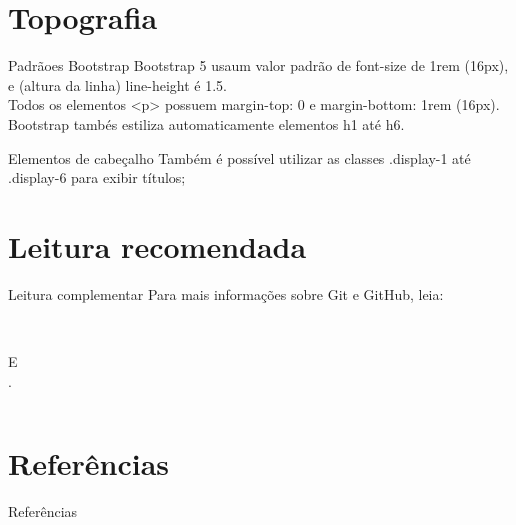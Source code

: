 \documentclass{beamer}
\begin{document}
\section{Topografia}
\begin{frame}{Padrãoes Bootstrap}
Bootstrap 5 usaum valor padrão de font-size de 1rem (16px), e (altura da linha) line-height é 1.5.\\
\vspace{0.5cm}
Todos os elementos <p> possuem margin-top: 0 e margin-bottom: 1rem (16px).\\
Bootstrap tambés estiliza automaticamente elementos h1 até h6.
\cite{wschool2021css}
    
\end{frame}
\begin{frame}{Elementos de cabeçalho}
Também é possível utilizar as classes .display-1 até .display-6 para exibir títulos;
    
\end{frame}

\section{Leitura recomendada}
\begin{frame}{Leitura complementar}
 Para mais informações sobre Git e GitHub, leia:\\
  \vspace{0.6cm}
 \begin{columns}
   \begin{column}{0.4\textwidth}
 \cite{githubpages2022}\\
 E\\
 \cite{beer2015github}.
   \end{column}
   \begin{column}{0.4\textwidth}
   \end{column}

 \end{columns}
\end{frame}

\section{Referências}

\begin{frame}{Referências}%
\small
\begin{center}
\tiny


\end{center}
\end{frame}
\end{document}
